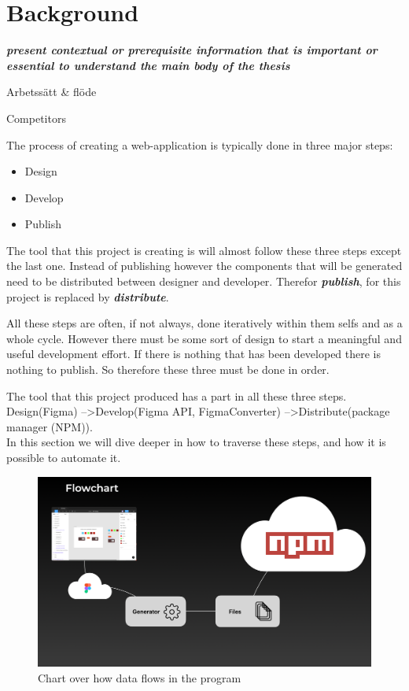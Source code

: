 \section{Background}
\textbf{\textit{present contextual or prerequisite information that is important or essential to understand the main body of the thesis}}

Arbetssätt \& flöde

Competitors


The process of creating a web-application is typically done in three major steps: 
\begin{itemize}
  \item Design
  \item Develop
  \item Publish
\end{itemize}

The tool that this project is creating is will almost follow these three steps except the last one. Instead of publishing however the components that will be generated need to be distributed between designer and developer. Therefor \textbf{\textit{publish}}, for this project is replaced by \textbf{\textit{distribute}}.

All these steps are often, if not always, done iteratively within them selfs and as a whole cycle. However there must be some sort of design to start a meaningful and useful development effort. If there is nothing that has been developed there is nothing to publish. So therefore these three must be done in order. 

The tool that this project produced has a part in all these three steps.\\ 
Design(Figma) --\textgreater Develop(Figma API, FigmaConverter) --\textgreater Distribute(package manager (NPM)).\\
In this section we will dive deeper in how to traverse these steps, and how it is possible to automate it.


\begin{figure}[H]
  \centering
  \includegraphics[width=0.8\linewidth]{images/flow.png}
  \caption{Chart over how data flows in the program}%
  \label{fig:flow}
\end{figure}


